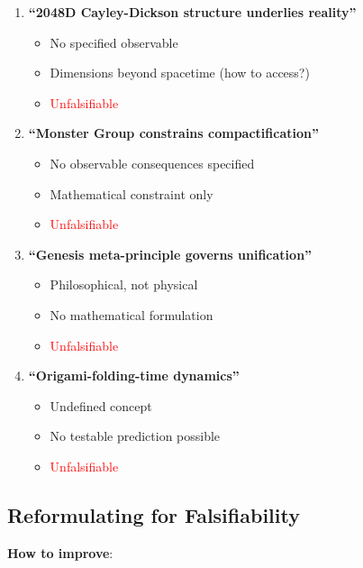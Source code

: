 \begin{enumerate}
    \item \textbf{``2048D Cayley-Dickson structure underlies reality''}
    \begin{itemize}
        \item No specified observable
        \item Dimensions beyond spacetime (how to access?)
        \item \textcolor{red}{Unfalsifiable}
    \end{itemize}

    \item \textbf{``Monster Group constrains compactification''}
    \begin{itemize}
        \item No observable consequences specified
        \item Mathematical constraint only
        \item \textcolor{red}{Unfalsifiable}
    \end{itemize}

    \item \textbf{``Genesis meta-principle governs unification''}
    \begin{itemize}
        \item Philosophical, not physical
        \item No mathematical formulation
        \item \textcolor{red}{Unfalsifiable}
    \end{itemize}

    \item \textbf{``Origami-folding-time dynamics''}
    \begin{itemize}
        \item Undefined concept
        \item No testable prediction possible
        \item \textcolor{red}{Unfalsifiable}
    \end{itemize}
\end{enumerate}

\subsection{Reformulating for Falsifiability}

\textbf{How to improve}:


